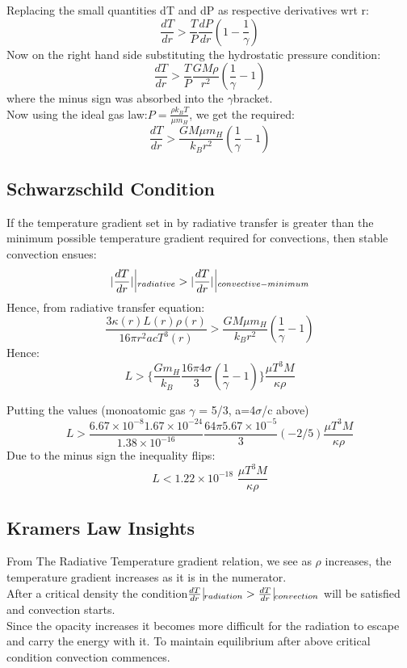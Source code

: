 \documentclass[11pt]{article}
\begin{document}
	Replacing the small quantities dT and dP as respective derivatives wrt r:
	\[
		\frac{dT}{dr} > \frac{T}{P}\frac{dP}{dr}(1-\frac{1}{\gamma})
	\]
	Now on the right hand side substituting the hydrostatic pressure condition:
	\[
		\frac{dT}{dr}> \frac{T}{P}\frac{GM\rho}{r^2}(\frac{1}{\gamma}-1)
	\]
	where the minus sign was absorbed into the $\gamma$bracket.\\
	Now using the ideal gas law:\(P = \frac{\rho k_BT}{\mu m_H}\), we get the required:
	\[
		\boxed{\frac{dT}{dr} > \frac{GM\mu m_H}{k_B r^2}(\frac{1}{\gamma} - 1)}
	\]
	
	\subsection{Schwarzschild Condition}
	
	If the temperature gradient set in by radiative transfer is greater than the minimum possible temperature gradient required for convections, then stable convection ensues:
	\[
		|\frac{dT}{dr}|\, \vline_{\, radiative} > |\frac{dT}{dr}|\, \vline_{\, convective-minimum}
	\]
	Hence, from radiative transfer equation:
	\[
		\frac{3\kappa(r)L(r)\rho(r)}{16\pi r^2acT^3(r)}>\frac{GM\mu m_H}{k_B r^2}(\frac{1}{\gamma} - 1)
	\]
	Hence:
	\[
		L > \{\frac{Gm_H}{k_B}\frac{16\pi4\sigma}{3}(\frac{1}{\gamma}-1)\}\frac{\mu T^3M}{\kappa\rho}
	\]
	
	Putting the values (monoatomic gas $\gamma$ = 5/3, a=4$\sigma$/c above)
	\[
		L > \frac{6.67\times10^{-8} 1.67\times 10^{-24}}{1.38\times 10^{-16}}\frac{64\pi5.67\times10^{-5}}{3}(-2/5)\frac{\mu T^3M}{\kappa\rho}
	\]
	Due to the minus sign the inequality flips:
	\[
		\boxed{L<1.22 \times 10^{-18} \,\, \frac{\mu T^3M}{\kappa\rho}}
	\]
	
	\subsection{Kramers Law Insights}
	
	From The Radiative Temperature gradient relation, we see as $\rho$ increases, the temperature gradient increases as it is in the numerator.\\
	After a critical density the condition\(\frac{dT}{dr}\, \vline_{radiation}>\frac{dT}{dr} \, \vline_{convection}\) will be satisfied and convection starts.\\
	
	Since the opacity increases it becomes more difficult for the radiation to escape and carry the energy with it. To maintain equilibrium after above critical condition convection commences. 
	
\end{document}
